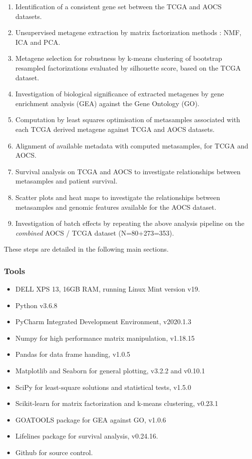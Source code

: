 \documentclass[tikz, 11pt,a4paper,oneside,fleqn]{article}
\begin{document}
\begin{enumerate}
\item
Identification of a consistent gene set between the TCGA and AOCS datasets.
\item
Unsupervised metagene extraction by matrix factorization methods : NMF, ICA and PCA.
\item
Metagene selection for robustness by k-means clustering of bootstrap resampled factorizations evaluated by silhouette score, based on the TCGA dataset.
\item
Investigation of biological significance of extracted metagenes by gene enrichment analysis (GEA) against the Gene Ontology (GO).
\item
Computation by least squares optimisation of metasamples associated with each TCGA derived metagene against TCGA and AOCS datasets.
\item
Alignment of available metadata with computed metasamples, for TCGA and AOCS.
\item 
Survival analysis on TCGA and AOCS to investigate relationships between metasamples and patient survival.
\item
Scatter plots and heat maps to investigate the relationships between metasamples and genomic features available for the AOCS dataset.
\item
Investigation of batch effects by repeating the above analysis pipeline on the \emph{combined} AOCS / TCGA dataset (N=80+273=353).

\end{enumerate}

These steps are detailed in the following main sections.

\FloatBarrier

\subsubsection{Tools}
\begin{itemize}
\itemsep -0.5em 
\item DELL XPS 13, 16GB RAM, running Linux Mint version v19.
\item Python v3.6.8
\item PyCharm Integrated Development Environment, v2020.1.3
\item Numpy for high performance matrix manipulation, v1.18.15
\item Pandas for data frame handing, v1.0.5
\item Matplotlib and Seaborn for general plotting, v3.2.2 and v0.10.1
\item SciPy for least-square solutions and statistical tests, v1.5.0
\item Scikit-learn for matrix factorization and k-means clustering, v0.23.1
\item GOATOOLS package for GEA against GO, v1.0.6
\item Lifelines package for survival analysis, v0.24.16.
\item Github for source control.
\end{itemize}
\end{document}
